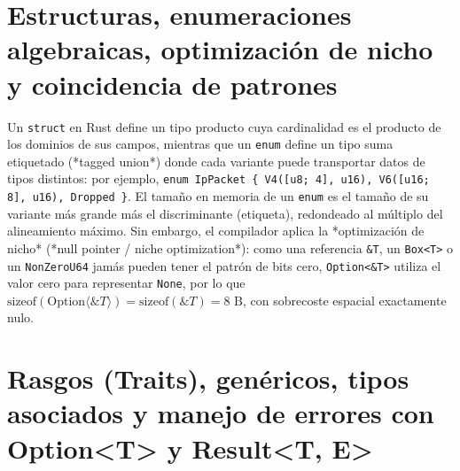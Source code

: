 \documentclass{book}
\begin{document}
\section{Estructuras, enumeraciones algebraicas, optimización de nicho y coincidencia de patrones}

Un \texttt{struct} en Rust define un tipo producto cuya cardinalidad es el producto de los dominios de sus campos, mientras que un \texttt{enum} define un tipo suma etiquetado (*tagged union*) donde cada variante puede transportar datos de tipos distintos: por ejemplo, \texttt{enum IpPacket \{ V4([u8; 4], u16), V6([u16; 8], u16), Dropped \}}. El tamaño en memoria de un \texttt{enum} es el tamaño de su variante más grande más el discriminante (etiqueta), redondeado al múltiplo del alineamiento máximo. Sin embargo, el compilador aplica la *optimización de nicho* (*null pointer / niche optimization*): como una referencia \texttt{\&T}, un \texttt{Box<T>} o un \texttt{NonZeroU64} jamás pueden tener el patrón de bits cero, \texttt{Option<\&T>} utiliza el valor cero para representar \texttt{None}, por lo que \(\text{sizeof}(\text{Option}\langle\&T\rangle) = \text{sizeof}(\&T) = 8\text{ B}\), con sobrecoste espacial exactamente nulo.

\section{Rasgos (Traits), genéricos, tipos asociados y manejo de errores con Option<T> y Result<T, E>}
\end{document}

